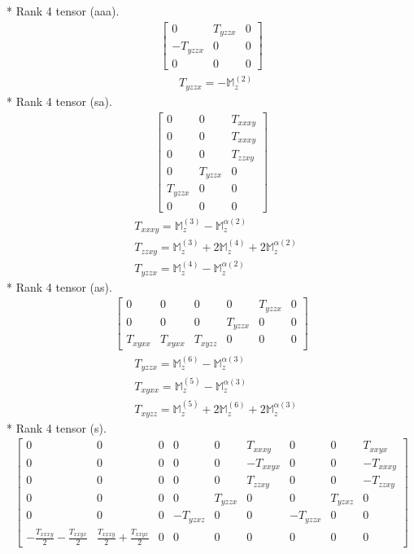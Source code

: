 \documentclass[fleqn,8pt,landscape]{jsarticle}
\begin{document}
* Rank 4 tensor (aaa).
\begin{align*}
\begin{bmatrix} 0 & T_{yzzx} & 0 \\ - T_{yzzx} & 0 & 0 \\ 0 & 0 & 0 \end{bmatrix}
\end{align*}
\begin{align*}
& T_{yzzx} = - \mathbb{M}_{z}^{(2)}
\end{align*}
* Rank 4 tensor (sa).
\begin{align*}
\begin{bmatrix} 0 & 0 & T_{xxxy} \\ 0 & 0 & T_{xxxy} \\ 0 & 0 & T_{zzxy} \\ 0 & T_{yzzx} & 0 \\ T_{yzzx} & 0 & 0 \\ 0 & 0 & 0 \end{bmatrix}
\end{align*}
\begin{align*}
& T_{xxxy} = \mathbb{M}_{z}^{(3)} - \mathbb{M}_{z}^{\alpha(2)} \\
& T_{zzxy} = \mathbb{M}_{z}^{(3)} + 2 \mathbb{M}_{z}^{(4)} + 2 \mathbb{M}_{z}^{\alpha(2)} \\
& T_{yzzx} = \mathbb{M}_{z}^{(4)} - \mathbb{M}_{z}^{\alpha(2)}
\end{align*}
* Rank 4 tensor (as).
\begin{align*}
\begin{bmatrix} 0 & 0 & 0 & 0 & T_{yzzx} & 0 \\ 0 & 0 & 0 & T_{yzzx} & 0 & 0 \\ T_{xyxx} & T_{xyxx} & T_{xyzz} & 0 & 0 & 0 \end{bmatrix}
\end{align*}
\begin{align*}
& T_{yzzx} = \mathbb{M}_{z}^{(6)} - \mathbb{M}_{z}^{\alpha(3)} \\
& T_{xyxx} = \mathbb{M}_{z}^{(5)} - \mathbb{M}_{z}^{\alpha(3)} \\
& T_{xyzz} = \mathbb{M}_{z}^{(5)} + 2 \mathbb{M}_{z}^{(6)} + 2 \mathbb{M}_{z}^{\alpha(3)}
\end{align*}
* Rank 4 tensor (s).
\begin{align*}
\begin{bmatrix} 0 & 0 & 0 & 0 & 0 & T_{xxxy} & 0 & 0 & T_{xxyx} \\ 0 & 0 & 0 & 0 & 0 & - T_{xxyx} & 0 & 0 & - T_{xxxy} \\ 0 & 0 & 0 & 0 & 0 & T_{zzxy} & 0 & 0 & - T_{zzxy} \\ 0 & 0 & 0 & 0 & T_{yzzx} & 0 & 0 & T_{yzxz} & 0 \\ 0 & 0 & 0 & - T_{yzxz} & 0 & 0 & - T_{yzzx} & 0 & 0 \\ - \frac{T_{xxxy}}{2} - \frac{T_{xxyx}}{2} & \frac{T_{xxxy}}{2} + \frac{T_{xxyx}}{2} & 0 & 0 & 0 & 0 & 0 & 0 & 0 \end{bmatrix}
\end{align*}
\end{document}
